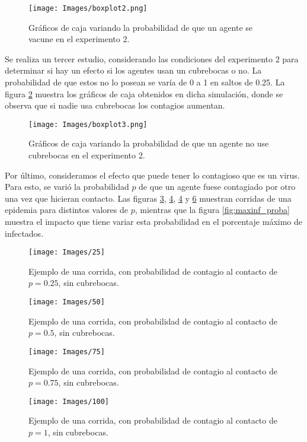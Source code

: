 \documentclass[final,6p,times,twocolumn]{elsarticle}
\begin{document}
	\begin{figure}
		\label{conmasc1}
		\centering
		\texttt{[image: Images/boxplot2.png]}
		\caption{Gráficos de caja variando la probabilidad de que un agente se vacune en el experimento 2.}
	\end{figure}
	
	Se realiza un tercer estudio, considerando las condiciones del experimento 2 para determinar si hay un efecto si los agentes usan un cubrebocas o no. La probabilidad de que estos no lo posean se varía de 0 a 1 en saltos de 0.25. La figura \ref{conmasc2} muestra los gráficos de caja obtenidos en dicha simulación, donde se observa que si nadie usa cubrebocas los contagios aumentan.
	\begin{figure}
		\label{conmasc2}
		\centering
		\texttt{[image: Images/boxplot3.png]}
		\caption{Gráficos de caja variando la probabilidad de que un agente no use cubrebocas en el experimento 2.}
	\end{figure}

	Por último, consideramos el efecto que puede tener lo contagioso que es un virus. Para esto, se varió la probabilidad $p$ de que un agente fuese contagiado por otro una vez que hicieran contacto. Las figuras \ref{fig:p25}, \ref{fig:p50}, \ref{fig:p50} y \ref{fig:p100} muestran corridas de una epidemia para distintos valores de $p$, mientras que la figura \ref{fig:maxinf_proba} muestra el impacto que tiene variar esta probabilidad en el porcentaje máximo de infectados.
	
	\begin{figure}
		\centering
		\texttt{[image: Images/25]}
		\caption{Ejemplo de una corrida, con probabilidad de contagio al contacto de $p = 0.25$, sin cubrebocas.}
		\label{fig:p25}
	\end{figure}

	\begin{figure}
		\texttt{[image: Images/50]}
		\caption{Ejemplo de una corrida, con probabilidad de contagio al contacto de $p = 0.5$, sin cubrebocas.}
		\label{fig:p50}
	\end{figure}

	\begin{figure}
		\centering
		\texttt{[image: Images/75]}
		\caption{Ejemplo de una corrida, con probabilidad de contagio al contacto de $p = 0.75$, sin cubrebocas.}
		\label{fig:p75}
	\end{figure}

	\begin{figure}
		\texttt{[image: Images/100]}
		\caption{Ejemplo de una corrida, con probabilidad de contagio al contacto de $p = 1$, sin cubrebocas.}
		\label{fig:p100}
	\end{figure}
\end{document}
